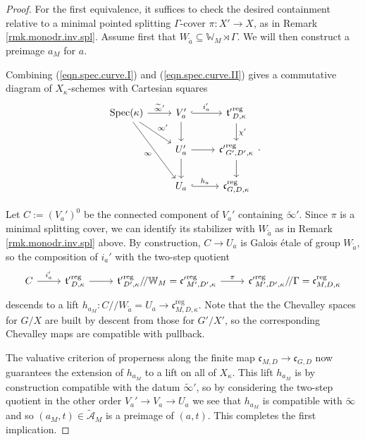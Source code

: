 \documentclass[openany]{amsbook}
\theoremstyle{definition}
\theoremstyle{remark}
\numberwithin{equation}{section}
\newcommand{\W}{\mathbb{W}}
\newcommand{\cA}{\mathcal{A}}
\renewcommand{\-}{\operatorname{-}}
\newcommand{\Spec}{\operatorname{Spec}}
\newcommand{\on}[1]{\operatorname{#1}}
\newcommand{\wtilde}[1]{\widetilde{#1}}
\newcommand{\reg}{\on{reg}}
\newcommand{\ctA}{\widetilde{\cA}}
\newcommand{\ft}{\mathfrak{t}}
\newcommand{\fc}{\mathfrak{c}}
\newcommand{\gitq}{/\!/}
\begin{document}
\begin{proof}
    For the first equivalence, it suffices to check the desired containment relative to a minimal pointed splitting $\Gamma$-cover $\pi : X' \to X$, as in Remark \ref{rmk.monodr.inv.spl}. Assume first that $W_{\wtilde{a}} \subseteq \W_M \rtimes \Gamma$. We will then construct a preimage $a_M$ for $a$. 
    
    
    Combining (\ref{eqn.spec.curve.I}) and (\ref{eqn.spec.curve.II}) gives a commutative diagram of $X_{\kappa}$-schemes with Cartesian squares
    \[
    \begin{tikzcd}[ampersand replacement=\&]
        \Spec(\kappa) \ar[r, "\wtilde{\infty}'"] \ar[dr, "\infty'"] \ar[ddr, "\infty" below left] \& V_a' \ar[d] \ar[r, hookrightarrow, "i_a'"] \& {\ft'}^{\reg}_{D, \kappa} \ar[d, "\chi'"] \\
        \& U_a' \ar[r] \ar[d] \& {\fc'}^{\reg}_{G', D',\kappa} \ar[d] \\
        \& U_a \ar[r, hookrightarrow, "h_a"] \& \fc_{G,D, \kappa}^{\reg}
    \end{tikzcd}.
    \]
    
    Let $C := (V_a')^0$ be the connected component of $V_a'$ containing $\wtilde{\infty}'$. Since $\pi$ is a minimal splitting cover, we can identify its stabilizer with $W_{\wtilde{a}}$ as in Remark \ref{rmk.monodr.inv.spl} above. By construction, $C \to U_a$ is Galois \'etale of group $W_{\wtilde{a}}$, so the composition of $i_a'$ with the two-step quotient 
    \[
        \begin{tikzcd}[ampersand replacement=\&]
            C \ar[r, "i_a'"] \& {\ft'}^{\reg}_{D, \kappa} \ar[r] \& {\ft'}^{\reg}_{D', \kappa}\gitq \W_M = {\fc'}^{\reg}_{M', D', \kappa}  \ar[r, "\pi"] \& {\fc'}^{\reg}_{M', D', \kappa}\gitq \Gamma = {\fc}^{\reg}_{M,D, \kappa}
        \end{tikzcd}
    \]
    descends to a lift $h_{a_M}: C \gitq W_{\wtilde{a}} = U_a \to {\fc}^{\reg}_{M,D, \kappa}$. Note that the the Chevalley spaces for $G/X$ are built by descent from those for $G'/X'$, so the corresponding Chevalley maps are compatible with pullback.

    The valuative criterion of properness along the finite map $\fc_{M,D} \to \fc_{G,D}$ now guarantees the extension of $h_{a_M}$ to a lift on all of $X_{\kappa}$. This lift $h_{a_M}$ is by construction compatible with the datum $\wtilde{\infty}'$, so by considering the two-step quotient in the other order $V_a' \to V_a \to U_a$ we see that $h_{a_M}$ is compatible with $\wtilde{\infty}$ and so $(a_M, t) \in \ctA_M$ is a preimage of $(a,t)$. This completes the first implication.


\end{proof}
\end{document}
